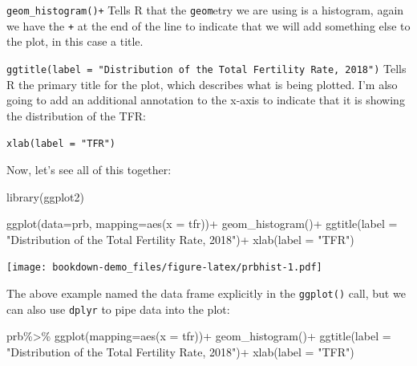 \documentclass[
]{article}
\newenvironment{Shaded}{\begin{snugshade}}{\end{snugshade}}
\newcommand{\AttributeTok}[1]{\textcolor[rgb]{0.77,0.63,0.00}{#1}}
\newcommand{\FunctionTok}[1]{\textcolor[rgb]{0.00,0.00,0.00}{#1}}
\newcommand{\NormalTok}[1]{#1}
\newcommand{\SpecialCharTok}[1]{\textcolor[rgb]{0.00,0.00,0.00}{#1}}
\newcommand{\StringTok}[1]{\textcolor[rgb]{0.31,0.60,0.02}{#1}}
\begin{document}
\texttt{geom\_histogram()+} Tells R that the \texttt{geom}etry we are using is a
histogram, again we have the \texttt{+} at the end of the line to indicate that
we will add something else to the plot, in this case a title.

\texttt{ggtitle(label\ =\ "Distribution\ of\ the\ Total\ Fertility\ Rate,\ 2018")}
Tells R the primary title for the plot, which describes what is being
plotted. I'm also going to add an additional annotation to the x-axis to
indicate that it is showing the distribution of the TFR:

\texttt{xlab(label\ =\ "TFR")}

Now, let's see all of this together:

\begin{Shaded}
\begin{Highlighting}[]
\FunctionTok{library}\NormalTok{(ggplot2)}

\FunctionTok{ggplot}\NormalTok{(}\AttributeTok{data=}\NormalTok{prb,}
       \AttributeTok{mapping=}\FunctionTok{aes}\NormalTok{(}\AttributeTok{x =}\NormalTok{ tfr))}\SpecialCharTok{+}
  \FunctionTok{geom\_histogram}\NormalTok{()}\SpecialCharTok{+}
  \FunctionTok{ggtitle}\NormalTok{(}\AttributeTok{label =} \StringTok{"Distribution of the Total Fertility Rate, 2018"}\NormalTok{)}\SpecialCharTok{+}
  \FunctionTok{xlab}\NormalTok{(}\AttributeTok{label =} \StringTok{"TFR"}\NormalTok{)}
\end{Highlighting}
\end{Shaded}

\texttt{[image: bookdown-demo\_files/figure-latex/prbhist-1.pdf]}

The above example named the data frame explicitly in the \texttt{ggplot()}
call, but we can also use \texttt{dplyr} to pipe data into the plot:

\begin{Shaded}
\begin{Highlighting}[]
\NormalTok{prb}\SpecialCharTok{\%\textgreater{}\%}
  \FunctionTok{ggplot}\NormalTok{(}\AttributeTok{mapping=}\FunctionTok{aes}\NormalTok{(}\AttributeTok{x =}\NormalTok{ tfr))}\SpecialCharTok{+}
  \FunctionTok{geom\_histogram}\NormalTok{()}\SpecialCharTok{+}
  \FunctionTok{ggtitle}\NormalTok{(}\AttributeTok{label =} \StringTok{"Distribution of the Total Fertility Rate, 2018"}\NormalTok{)}\SpecialCharTok{+}
  \FunctionTok{xlab}\NormalTok{(}\AttributeTok{label =} \StringTok{"TFR"}\NormalTok{)}
\end{Highlighting}
\end{Shaded}
\end{document}
